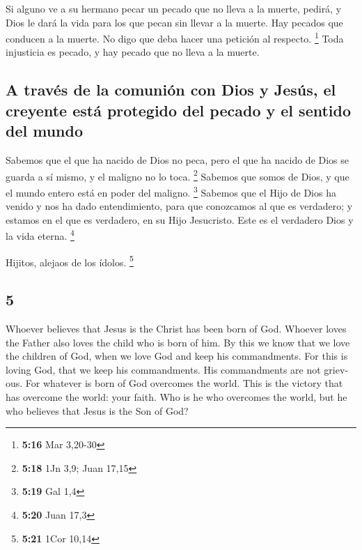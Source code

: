 \begin{paracol}{2}
 Si alguno ve a su hermano pecar un pecado que no lleva a
la muerte, pedirá, y Dios le dará la vida para los que pecan sin llevar
a la muerte. Hay pecados que conducen a la muerte. No digo que deba
hacer una petición al respecto. \footnote{\textbf{5:16} Mar 3,20-30}
 Toda injusticia es pecado, y hay pecado que no lleva a
la muerte.

\hypertarget{a-travuxe9s-de-la-comuniuxf3n-con-dios-y-jesuxfas-el-creyente-estuxe1-protegido-del-pecado-y-el-sentido-del-mundo}{%
\subsection{A través de la comunión con Dios y Jesús, el creyente está
protegido del pecado y el sentido del
mundo}\label{a-travuxe9s-de-la-comuniuxf3n-con-dios-y-jesuxfas-el-creyente-estuxe1-protegido-del-pecado-y-el-sentido-del-mundo}}

 Sabemos que el que ha nacido de Dios no peca, pero el
que ha nacido de Dios se guarda a sí mismo, y el maligno no lo toca.
\footnote{\textbf{5:18} 1Jn 3,9; Juan 17,15}  Sabemos que
somos de Dios, y que el mundo entero está en poder del maligno.
\footnote{\textbf{5:19} Gal 1,4}  Sabemos que el Hijo de
Dios ha venido y nos ha dado entendimiento, para que conozcamos al que
es verdadero; y estamos en el que es verdadero, en su Hijo Jesucristo.
Este es el verdadero Dios y la vida eterna. \footnote{\textbf{5:20} Juan
  17,3}

 Hijitos, alejaos de los ídolos. \footnote{\textbf{5:21}
  1Cor 10,14} \switchcolumn \begin{otherlanguage}{english}

\hypertarget{section-9}{%
\section{5}\label{section-9}}

 Whoever believes that Jesus is the Christ has been born
of God. Whoever loves the Father also loves the child who is born of
him.  By this we know that we love the children of God,
when we love God and keep his commandments.  For this is
loving God, that we keep his commandments. His commandments are not
grievous.  For whatever is born of God overcomes the
world. This is the victory that has overcome the world: your faith.
 Who is he who overcomes the world, but he who believes
that Jesus is the Son of God?


\end{otherlanguage}
\end{paracol}
